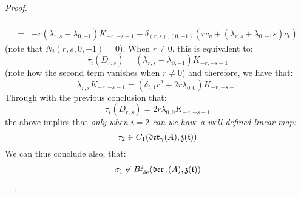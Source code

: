 \begin{proof}
\begin{itemize}
$$\begin{aligned}
                                \\
                                = & -r(\lambda_{r, s} - \lambda_{0, -1}) K_{-r, -s - 1} - \delta_{(r, s), (0, -1)} \left( r c_v + ( \lambda_{r, s} + \lambda_{0, -1} s ) c_t \right)
                            \end{aligned}
                        $$
                    (note that $N_i(r, s, 0, -1) = 0$). When $r \not = 0$, this is equivalent to:
                        $$\tau_i(D_{r, s}) = (\lambda_{r, s} - \lambda_{0, -1}) K_{-r, -s - 1}$$
                   (note how the second term vanishes when $r \not = 0$) and therefore, we have that:
                        $$\lambda_{r, s} K_{-r, -s - 1} = ( \delta_{i, 1} r^2 + 2r \lambda_{0, 0} ) K_{-r, -s - 1}$$
                    Through with the previous conclusion that:
                        $$\tau_i(D_{r, s}) = 2r \lambda_{0, 0} K_{-r, -s - 1}$$
                    the above implies that \textit{only when $i = 2$ can we have a well-defined linear map:}
                        $$\tau_2 \in C_1( \mathfrak{der}_{\gamma}(A), \mathfrak{z}(\mathfrak{t}) )$$
                    We can thus conclude also, that:
                        $$\sigma_1 \not \in B^2_{\mathrm{Lie}}( \mathfrak{der}_{\gamma}(A), \mathfrak{z}(\mathfrak{t}) )$$


\end{itemize}
\end{proof}
